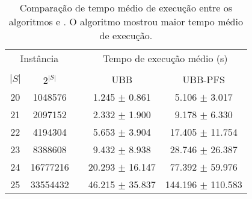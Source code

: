 \begin{table}
\centering
\footnotesize
\caption{Comparação de tempo médio de execução entre os algoritmos 
 e . O algoritmo  mostrou
maior tempo médio de execução.}
\label{tab:ubbpfs_vs_ubb_time}
\begin{tabular}{cc c cc}
\toprule
\multicolumn{2}{c}{Instância} & \phantom{} & \multicolumn{2}{c}{Tempo de execução médio (s)} \\
\cline{1-2}\cline{4-5}\\
$|S|$ & $2^{|S|}$ && UBB & UBB-PFS \\
20 & 1048576 &&  1.245 $\pm$ 0.861 & 5.106 $\pm$ 3.017 \\
21 & 2097152 &&  2.332 $\pm$ 1.900 & 9.178 $\pm$ 6.330 \\
22 & 4194304 &&  5.653 $\pm$ 3.904 & 17.405 $\pm$ 11.754 \\
23 & 8388608 &&  9.432 $\pm$ 8.938 & 28.746 $\pm$ 26.387 \\
24 & 16777216 &&  20.293 $\pm$ 16.147 & 77.392 $\pm$ 59.976 \\
25 & 33554432 &&  46.215 $\pm$ 35.837 & 144.196 $\pm$ 110.583 \\
\bottomrule
\end{tabular}
\end{table}


